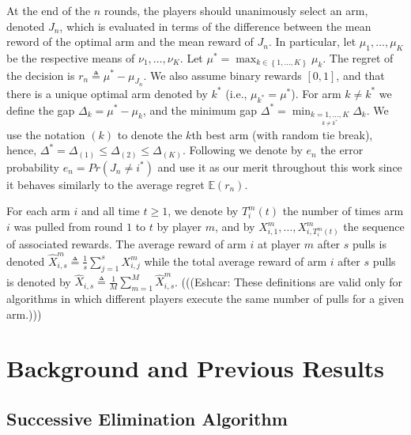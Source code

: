 \documentclass{sig-alternate}
\newcommand{\set}[1]{\left\{#1\right\}}
\def\E{{\mathbb E}}        %
\newcommand{\paren}[1]{\left( #1 \right)}
\newcommand{\bracket}[1]{\left[ #1 \right]}
\newcommand{\eshcar}[1]{(((Eshcar: #1)))}
\begin{document}
At the end of the $n$ rounds, the players should unanimously select an arm, denoted $J_n$, which is evaluated in terms of the difference between the mean reword of the optimal arm and the mean reward of $J_n$. In particular, let $\mu_1,\ldots,\mu_K$ be the respective means of $\nu_1,\ldots,\nu_K$. Let $\mu^*=\max_{k\in\set{1,\ldots,K}}\mu_k$. The regret of the decision is $r_n\triangleq\mu^*-\mu_{J_n}$. We also assume binary rewards $\bracket{0,1}$, and that there is a unique optimal arm denoted by $k^*$ (i.e., $\mu_{k^*}=\mu^*$). For arm $k\neq k^*$ we define the gap $\Delta_k=\mu^*-\mu_k$, and the minimum gap $\Delta^*=\min_{\underset{k\neq k^*}{k=1,\ldots,K}}\Delta_k$. We use the notation $\paren{k}$ to denote the $k$th best arm (with random tie break), hence, $\Delta^*=\Delta_{\paren{1}}\le\Delta_{\paren{2}}\le\Delta_{\paren{K}}$. Following \cite{Audibert-Bubeck-Munos-COLT2010} we denote by $e_n$ the error probability $e_n=Pr \paren{J_n\neq i^*}$ and use it as our merit throughout this work since it behaves similarly to the average regret $\E\paren{r_n}$.


For each arm $i$ and all time $t\ge 1$, we denote by $T^m_i(t)$ the number of times arm $i$ was pulled from round $1$ to $t$ by player $m$, and by $X^m_{i,1},\ldots,X^m_{i,T^m_i(t)}$ the sequence of associated rewards. The average reward of arm $i$ at player $m$ after $s$ pulls is denoted $\hat{X}^m_{i,s}\triangleq\frac{1}{s}\sum_{j=1}^s X^m_{i,j}$ while the total average reward of arm $i$ after $s$ pulls is denoted by $\hat{X}_{i,s}\triangleq\frac{1}{M}\sum_{m=1}^M \hat{X}^m_{i,s}$.
\eshcar{These definitions are valid only for algorithms in which different players execute the same number of pulls for a given arm.}

\section{Background and Previous Results}

\subsection{Successive Elimination Algorithm}\label{sec: SE algo}
\end{document}
